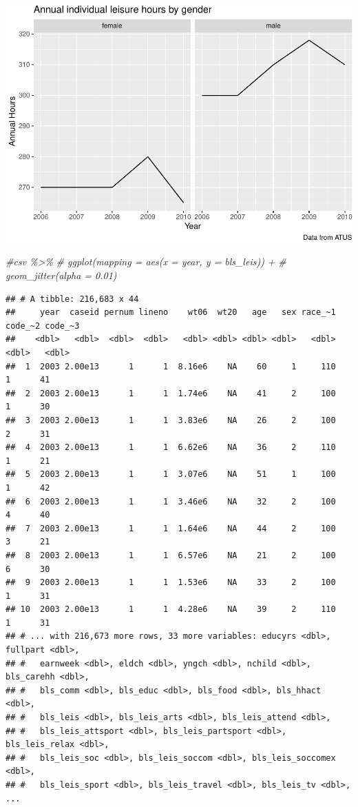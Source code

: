 \documentclass[
]{article}
\newenvironment{Shaded}{\begin{snugshade}}{\end{snugshade}}
\newcommand{\CommentTok}[1]{\textcolor[rgb]{0.56,0.35,0.01}{\textit{#1}}}
\begin{document}
\includegraphics{Paper2_files/figure-latex/graphs-10.pdf}

\begin{Shaded}
\begin{Highlighting}[]
\CommentTok{\#csv \%\textgreater{}\%}
 \CommentTok{\# ggplot(mapping = aes(x = year, y = bls\_leis)) + }
 \CommentTok{\# geom\_jitter(alpha = 0.01)}
\end{Highlighting}
\end{Shaded}

\begin{verbatim}
## # A tibble: 216,683 x 44
##     year  caseid pernum lineno    wt06  wt20   age   sex race_~1 code_~2 code_~3
##    <dbl>   <dbl>  <dbl>  <dbl>   <dbl> <dbl> <dbl> <dbl>   <dbl>   <dbl>   <dbl>
##  1  2003 2.00e13      1      1  8.16e6    NA    60     1     110       1      41
##  2  2003 2.00e13      1      1  1.74e6    NA    41     2     100       1      30
##  3  2003 2.00e13      1      1  3.83e6    NA    26     2     100       2      31
##  4  2003 2.00e13      1      1  6.62e6    NA    36     2     110       1      21
##  5  2003 2.00e13      1      1  3.07e6    NA    51     1     100       1      42
##  6  2003 2.00e13      1      1  3.46e6    NA    32     2     100       4      40
##  7  2003 2.00e13      1      1  1.64e6    NA    44     2     100       3      21
##  8  2003 2.00e13      1      1  6.57e6    NA    21     2     100       6      30
##  9  2003 2.00e13      1      1  1.53e6    NA    33     2     100       1      31
## 10  2003 2.00e13      1      1  4.28e6    NA    39     2     110       1      31
## # ... with 216,673 more rows, 33 more variables: educyrs <dbl>, fullpart <dbl>,
## #   earnweek <dbl>, eldch <dbl>, yngch <dbl>, nchild <dbl>, bls_carehh <dbl>,
## #   bls_comm <dbl>, bls_educ <dbl>, bls_food <dbl>, bls_hhact <dbl>,
## #   bls_leis <dbl>, bls_leis_arts <dbl>, bls_leis_attend <dbl>,
## #   bls_leis_attsport <dbl>, bls_leis_partsport <dbl>, bls_leis_relax <dbl>,
## #   bls_leis_soc <dbl>, bls_leis_soccom <dbl>, bls_leis_soccomex <dbl>,
## #   bls_leis_sport <dbl>, bls_leis_travel <dbl>, bls_leis_tv <dbl>, ...
\end{verbatim}
\end{document}
